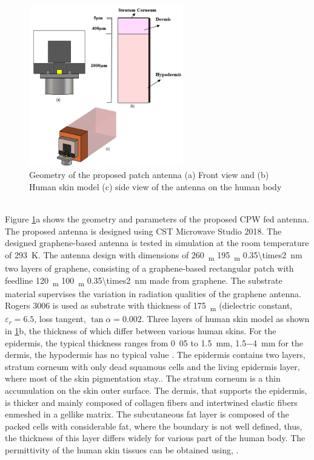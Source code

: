 \documentclass[12pt]{suhbook}
\begin{document}
\begin{figure}[hbt!]
\centering
\includegraphics[width=0.6\textwidth]{8}
\caption{Geometry of the proposed patch antenna (a) Front view and (b) Human skin model (c) side view of the antenna on the human body}
\label{Fig 8}
\end{figure}
\\Figure \ref{Fig 8}a shows the geometry and parameters of the proposed CPW fed antenna. The proposed antenna is designed using CST Microwave Studio \si{2018}. The designed graphene-based antenna is tested in simulation at the room temperature of \SI{293}{\kelvin}. The antenna design with dimensions of \SI{260}{\mu_m} \times \SI{195}{\mu_m} \times \SI{0.35\times2}{nm} two layers of graphene, consisting of a graphene-based rectangular patch with feedline \SI{120}{\mu_m} \times \SI{100}{\mu_m} \times \SI{0.35\times2}{nm} made from graphene. The substrate material supervises the variation in radiation qualities of the graphene antenna. Rogers \si{3006} is used as substrate with thickness of \SI{175}{\mu_m} (dielectric constant,$\varepsilon_r = 6.5$, loss tangent, $\tan {\alpha} = 0.002$. Three layers of human skin model as shown in \ref{Fig 8}b, the thickness of which differ between various human skins. For the epidermis, the typical thickness ranges from \si{0.05} to \SI{1.5}{mm}, \SI{1.5-4}{mm} for the dermis, the hypodermis has no typical value \cite{dashti2018graphene}. The epidermis contains two layers, stratum corneum with only dead squamous cells and the living epidermis layer, where most of the skin pigmentation stay.\cite{abadal2015time}. The stratum corneum is a thin accumulation on the skin outer surface. The dermis, that supports the epidermis, is thicker and mainly composed of collagen fibers and intertwined elastic fibers enmeshed in a gellike matrix. The subcutaneous fat layer is composed of the packed cells with considerable fat, where the boundary is not well defined, thus, the thickness of this layer differs widely for various part of the human body. The permittivity of the human skin tissues can be obtained using,\cite{berry2003optical} \cite{yang2015numerical}.
\end{document}
